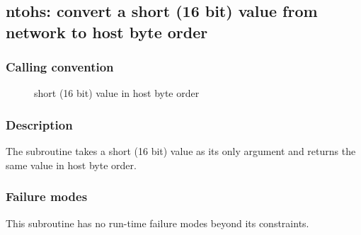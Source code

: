 \clearpage
{}
{}
\label{subr:ntohs}
\subsection*{ntohs: convert a short (16 bit) value from network to
  host byte order}

\subsubsection*{Calling convention}

\begin{description}
\item[] short (16 bit) value in host byte order
\end{description}

\subsubsection*{Description}

The  subroutine takes a short (16 bit) value as its
only argument and returns the same value in host byte order.

\subsubsection*{Failure modes}

This subroutine has no run-time failure modes beyond its constraints.
